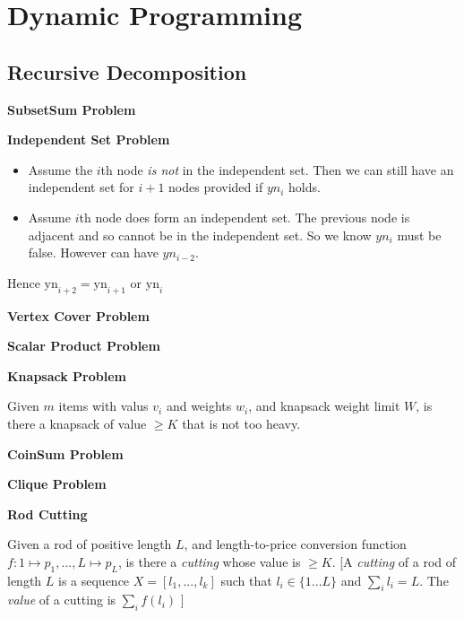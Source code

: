 
\chapter{Dynamic Programming}


\section{Recursive Decomposition}



\textbf{SubsetSum Problem}









\textbf{Independent Set Problem}


\begin{itemize}  
\renewcommand{\labelitemi}{$\Box$}
\item Assume the $i$th node \textit{is not} in the independent set. Then we can still have 
an independent set for $i+1$ nodes provided if $yn_{i}$ holds. 
\item Assume $i$th node does form an independent set. The previous node is adjacent and 
so cannot be in the independent set. 
So we know $yn_{i}$ must be false. However can have $yn_{i-2}$. 
\end{itemize} 
Hence $\text{yn}_{i+2} = \text{yn}_{i+1}$ or  $\text{yn}_{i}$

\textbf{Vertex Cover Problem}

\frmrule

\textbf{Scalar Product Problem}

\frmrule

\textbf{Knapsack Problem}

Given $m$ items with valus $v_i$ and weights $w_i$, 
and knapsack weight limit $W$, is there a knapsack of 
value $\geqslant K$ that is not too heavy. 


\textbf{CoinSum Problem}

\frmrule

\textbf{Clique Problem}

\frmrule

\textbf{Rod Cutting}

Given a rod of positive length $L$, and length-to-price conversion 
function $f: 1 \mapsto p_1, ..., L \mapsto p_L$, 
is there a \textit{cutting} whose value is $\geqslant K$. 
[A \textit{cutting} of a rod of length $L$ is a sequence $X = [l_1, ..., l_k]$ such 
that $l_i \in \{1...L\}$ and $\sum_i l_i = L$. The \textit{value} of a cutting is $\sum_i f(l_i)$ ] 



